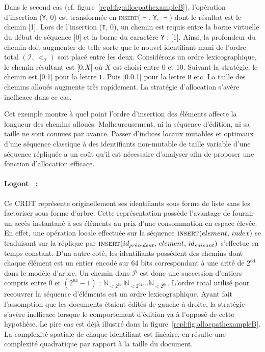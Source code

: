 Dans le second cas (cf. figure~\ref{repl:fig:allocpathexampleB}), l'opération
d'insertion (\texttt{Y}, 0) est transformée en \textsc{insert}($\vdash$,
\texttt{Y}, $\dashv$) dont le résultat est le chemin [1]. Lors de l'insertion
(\texttt{T}, 0), un chemin est requis entre la borne virtuelle du début de
séquence [0] et la borne du caractère \texttt{Y} : [1]. Ainsi, la profondeur du
chemin doit augmenter de telle sorte que le nouvel identifiant muni de l'ordre
total $(\mathcal{I},\,<_\mathcal{I})$ soit placé entre les deux. Considérons un
ordre lexicographique, le chemin résultant est [0.$X$] où $X$ est choisi entre 0
et 10. Suivant la stratégie, le chemin est [0.1] pour la lettre \texttt{T}. Puis
[0.0.1] pour la lettre \texttt{R} etc. La taille des chemins alloués augmente
très rapidement.  La stratégie d'allocation s'avère inefficace dans ce cas.

Cet exemple montre à quel point l'ordre d'insertion des éléments affecte la
longueur des chemins alloués. Malheureusement, ni la séquence d'édition, ni sa
taille ne sont connues par avance.  Passer d'indices locaux mutables et optimaux
d'une séquence classique à des identifiants non-mutable de taille variable d'une
séquence répliquée a un coût qu'il est nécessaire d'analyser afin de proposer
une fonction d'allocation efficace.

\paragraph{Logoot~\cite{weiss2010collaborative, weiss2009logoot,
    weiss2010logootundo} :} Ce CRDT représente originellement ses identifiants
sous forme de liste sans les factoriser sous forme d'arbre. Cette représentation
possède l'avantage de fournir un accès instantané à ses éléments au prix d'une
consommation en espace élevée. En effet, une opération locale effectuée sur la
séquence $\textsc{insert}(element,\, index)$ se traduisant sur la réplique par
$\textsc{insert}(id_{pr\acute{e}cedent},\, element,\, id_{suivant})$ s'effectue
en temps constant. D'un autre coté, les identifiants possèdent des chemins dont
chaque élément est un entier encodé sur 64 bits correspondant à une arité de
$2^{64}$ dans le modèle d'arbre. Un chemin dans $\mathcal{P}$ est donc une
succession d'entiers compris entre 0 et $(2^{64}-1)$ :
$\mathbb{N}_{<2^{64}}.\mathbb{N}_{<2^{64}}\ldots\mathbb{N}_{<2^{64}}$.  L'ordre
total utilisé pour recouvrer la séquence d'éléments est un ordre
lexicographique. Ayant fait l'assomption que les documents étaient édités de
gauche à droite, la stratégie s'avère inefficace lorsque le comportement
d'édition va à l'opposé de cette hypothèse. Le pire cas est déjà illustré dans
la figure~\ref{repl:fig:allocpathexampleB}. La complexité spatiale de chaque
identifiant est linéaire, en résulte une complexité quadratique par rapport à la
taille du document.


